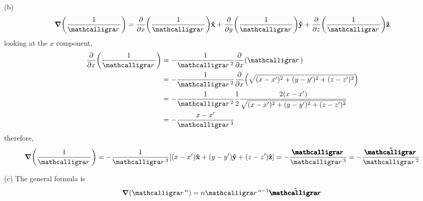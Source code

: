 \documentclass[../main.tex]{subfiles}
\begin{document}
(b)
\begin{align*}
    \grad(\frac{1}{\scriptr}) &= \pdv{x}(\frac{1}{\scriptr}) \vu{x}
        + \pdv{y}(\frac{1}{\scriptr}) \vu{y} + \pdv{z}(\frac{1}{\scriptr}) \vu{z} \\
\end{align*}
looking at the $x$ component,
\begin{align*}
    \pdv{x}(\frac{1}{\scriptr}) &= -\frac{1}{\scriptr^2} \pdv{x}(\scriptr) \\
    &= -\frac{1}{\scriptr^2} \pdv{x}(\sqrt{(x - x')^2 + (y - y')^2 + (z - z')^2}) \\
    &= -\frac{1}{\scriptr^2} \frac{1}{2}
        \frac{2(x - x')}{\sqrt{(x - x')^2 + (y - y')^2 + (z - z')^2}} \\
    &= -\frac{x - x'}{\scriptr^3}
\end{align*}
therefore,
\begin{align*}
    \grad(\frac{1}{\scriptr}) = -\frac{1}{\scriptr^3}
        [(x - x') \vu{x} + (y - y') \vu{y} + (z - z') \vu{z}]
    = -\frac{\boldscriptr}{\scriptr^3} 
    = -\frac{\vu{\boldscriptr}}{\scriptr^2}
\end{align*}

(c) The general formula is
\begin{align*}
    \grad(\scriptr^n) = n \scriptr^{n-1} \vu{\boldscriptr}
\end{align*}
\end{document}
